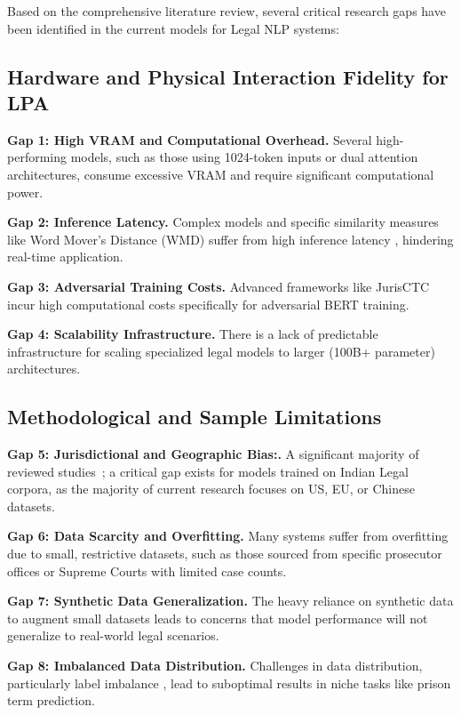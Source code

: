 Based on the comprehensive literature review, several critical research gaps have been identified in the current models for Legal NLP systems:

\subsection{Hardware and Physical Interaction Fidelity for LPA}
\textbf{Gap 1: High VRAM and Computational Overhead.} Several high-performing models, such as those using 1024-token \cite{b5} inputs or dual attention architectures, consume excessive VRAM and require significant computational power.

\textbf{Gap 2: Inference Latency.} Complex models and specific similarity measures like Word Mover’s Distance (WMD) \cite{b6} suffer from high inference latency \cite{b8}, hindering real-time application.

\textbf{Gap 3: Adversarial Training Costs.} Advanced frameworks like JurisCTC \cite{b14} incur high computational costs specifically for adversarial BERT training.

\textbf{Gap 4: Scalability Infrastructure.} There is a lack of predictable infrastructure for scaling specialized legal models to larger (100B+ parameter) \cite{b22} architectures.



\subsection{Methodological and Sample Limitations}
\textbf{Gap 5: Jurisdictional and Geographic Bias:.} A significant majority of reviewed studies~\cite{b6, b8, b11, b16}; a critical gap exists for models trained on Indian Legal corpora, as the majority of current research focuses on US, EU, or Chinese datasets.

\textbf{Gap 6: Data Scarcity and Overfitting.} Many systems suffer from overfitting \cite{b4}  \cite{b7} \cite{b20} due to small, restrictive datasets, such as those sourced from specific prosecutor offices or Supreme Courts with limited case counts.	

\textbf{Gap 7: Synthetic Data Generalization.} The heavy reliance on synthetic data to augment small datasets \cite{b4} \cite{b20} leads to concerns that model performance will not generalize to real-world legal scenarios.

\textbf{Gap 8: Imbalanced Data Distribution.} Challenges in data distribution, particularly label imbalance \cite{b7} \cite{b25}, lead to suboptimal results in niche tasks like prison term prediction.

